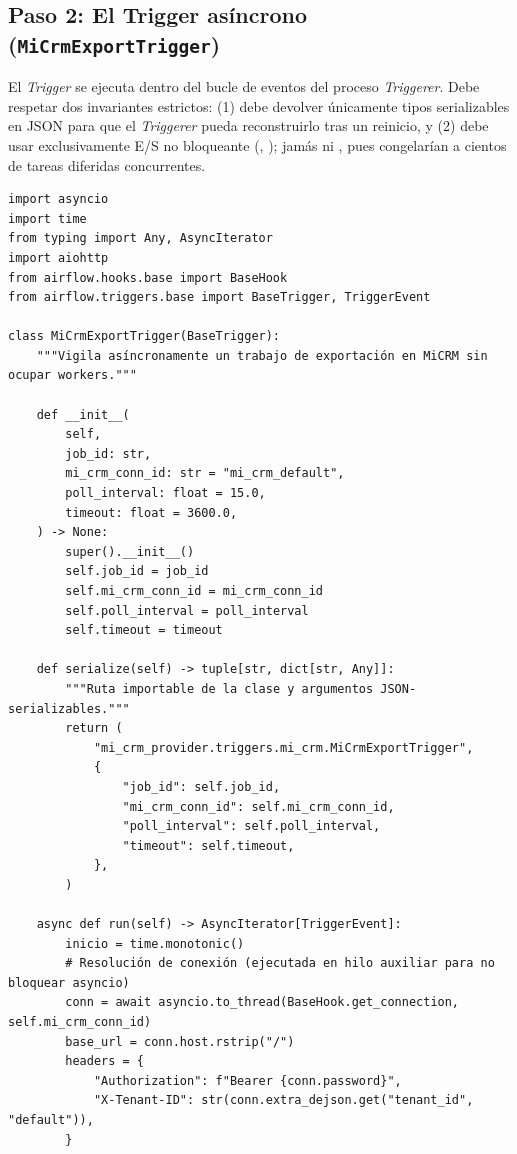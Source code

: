 \subsection{Paso 2: El Trigger asíncrono (\texttt{MiCrmExportTrigger})}

El \textit{Trigger} se ejecuta dentro del bucle de eventos  del proceso \textit{Triggerer}. Debe respetar dos invariantes estrictos: (1)  debe devolver únicamente tipos serializables en JSON para que el \textit{Triggerer} pueda reconstruirlo tras un reinicio, y (2)  debe usar exclusivamente E/S no bloqueante (, ); jamás  ni , pues congelarían a cientos de tareas diferidas concurrentes.

\begin{lstlisting}[style=python, caption={Implementación del Trigger asíncrono (\texttt{mi\_crm\_provider/triggers/mi\_crm.py}).}, label={lst:custom-trigger}]
import asyncio
import time
from typing import Any, AsyncIterator
import aiohttp
from airflow.hooks.base import BaseHook
from airflow.triggers.base import BaseTrigger, TriggerEvent

class MiCrmExportTrigger(BaseTrigger):
    """Vigila asíncronamente un trabajo de exportación en MiCRM sin ocupar workers."""

    def __init__(
        self,
        job_id: str,
        mi_crm_conn_id: str = "mi_crm_default",
        poll_interval: float = 15.0,
        timeout: float = 3600.0,
    ) -> None:
        super().__init__()
        self.job_id = job_id
        self.mi_crm_conn_id = mi_crm_conn_id
        self.poll_interval = poll_interval
        self.timeout = timeout

    def serialize(self) -> tuple[str, dict[str, Any]]:
        """Ruta importable de la clase y argumentos JSON-serializables."""
        return (
            "mi_crm_provider.triggers.mi_crm.MiCrmExportTrigger",
            {
                "job_id": self.job_id,
                "mi_crm_conn_id": self.mi_crm_conn_id,
                "poll_interval": self.poll_interval,
                "timeout": self.timeout,
            },
        )

    async def run(self) -> AsyncIterator[TriggerEvent]:
        inicio = time.monotonic()
        # Resolución de conexión (ejecutada en hilo auxiliar para no bloquear asyncio)
        conn = await asyncio.to_thread(BaseHook.get_connection, self.mi_crm_conn_id)
        base_url = conn.host.rstrip("/")
        headers = {
            "Authorization": f"Bearer {conn.password}",
            "X-Tenant-ID": str(conn.extra_dejson.get("tenant_id", "default")),
        }


\end{lstlisting}
